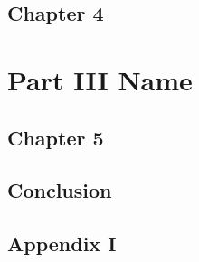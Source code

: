 \documentclass[a4, english, twoside]{book}
\begin{document}
  \chapter{Chapter 4}
  \lipsum

\part{Part III Name}
  \chapter{Chapter 5}
  \lipsum

\chapter{Conclusion} \label{chap:conclusion}

\printbibliography

\newpage \appendix
\chapter{Appendix I} \label{app:A}
\lipsum
\end{document}
